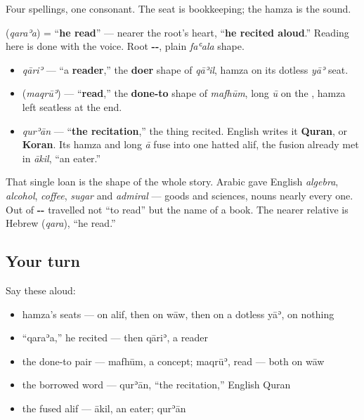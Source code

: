 Four spellings, one consonant. The seat is bookkeeping; the hamza is the sound.

\begin{cousinweb}
\textbf{} (\emph{qaraʾa}) = \textquotedblleft{}\textbf{he read}\textquotedblright{} — nearer the root's heart, \textquotedblleft{}\textbf{he recited aloud}.\textquotedblright{} Reading here is done with the voice. Root \textbf{--}, plain \emph{faʿala} shape.

\begin{itemize}
\raggedright
  \item \emph{qāriʾ} — \textquotedblleft{}a \textbf{reader},\textquotedblright{} the \textbf{doer} shape of \emph{qāʾil}, hamza on its dotless \emph{yāʾ} seat.
  \item \textbf{} (\emph{maqrūʾ}) — \textquotedblleft{}\textbf{read},\textquotedblright{} the \textbf{done-to} shape of \emph{mafhūm}, long \emph{ū} on the \textbf{}, hamza left seatless at the end.
  \item \emph{qurʾān} — \textquotedblleft{}\textbf{the recitation},\textquotedblright{} the thing recited. English writes it \textbf{Quran}, or \textbf{Koran}. Its hamza and long \emph{ā} fuse into one hatted alif, the fusion already met in \emph{ākil}, \textquotedblleft{}an eater.\textquotedblright{}
\end{itemize}

That single loan is the shape of the whole story. Arabic gave English \emph{algebra}, \emph{alcohol}, \emph{coffee}, \emph{sugar} and \emph{admiral} — goods and sciences, nouns nearly every one. Out of \textbf{--} travelled not \textquotedblleft{}to read\textquotedblright{} but the name of a book. The nearer relative is Hebrew \textbf{} (\emph{qara}), \textquotedblleft{}he read.\textquotedblright{}
\end{cousinweb}

\subsection*{Your turn}
Say these aloud:

\begin{itemize}
\raggedright
  \item hamza's seats —  on alif, then on wāw, then on a dotless yāʾ,  on nothing
  \item \textquotedblleft{}qaraʾa,\textquotedblright{} he recited — then qāriʾ, a reader
  \item the done-to pair — mafhūm, a concept; maqrūʾ, read — both on wāw
  \item the borrowed word — qurʾān, \textquotedblleft{}the recitation,\textquotedblright{} English Quran
  \item the fused alif — ākil, an eater; qurʾān
\end{itemize}

